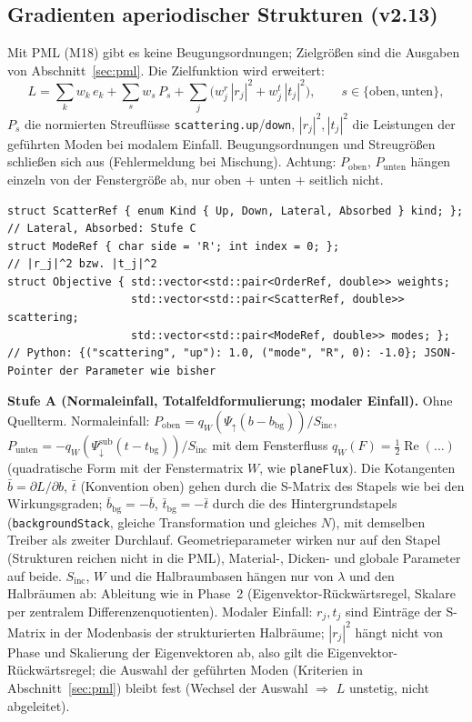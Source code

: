 \subsection{Gradienten aperiodischer Strukturen (v2.13)}\label{sec:adj_aperiodic}
Mit PML (M18) gibt es keine Beugungsordnungen; Zielgrößen sind die Ausgaben von Abschnitt~\ref{sec:pml}. Die Zielfunktion
wird erweitert:
\begin{equation}
  L=\sum_k w_k\,e_k+\sum_s w_s\,P_s+\sum_j\big(w^r_j\,|r_j|^2+w^t_j\,|t_j|^2\big),\qquad s\in\{\text{oben},\text{unten}\},
  \label{eq:obj_aperiodic}
\end{equation}
$P_s$ die normierten Streuflüsse \verb|scattering.up|/\verb|down|, $|r_j|^2,|t_j|^2$ die Leistungen der geführten Moden
bei modalem Einfall. Beugungsordnungen und Streugrößen schließen sich aus (Fehlermeldung bei Mischung).
Achtung: $P_{\text{oben}}$, $P_{\text{unten}}$ hängen einzeln von der Fenstergröße ab, nur oben $+$ unten $+$ seitlich nicht.
{\footnotesize\begin{verbatim}
struct ScatterRef { enum Kind { Up, Down, Lateral, Absorbed } kind; };          // Lateral, Absorbed: Stufe C
struct ModeRef { char side = 'R'; int index = 0; };                              // |r_j|^2 bzw. |t_j|^2
struct Objective { std::vector<std::pair<OrderRef, double>> weights;
                   std::vector<std::pair<ScatterRef, double>> scattering;
                   std::vector<std::pair<ModeRef, double>> modes; };
// Python: {("scattering", "up"): 1.0, ("mode", "R", 0): -1.0}; JSON-Pointer der Parameter wie bisher
\end{verbatim}}
\textbf{Stufe A (Normaleinfall, Totalfeldformulierung; modaler Einfall).} Ohne Quellterm. Normaleinfall:
$P_{\text{oben}}=q_W(\Psi_{\uparrow}(b-b_{\text{bg}}))/S_{\text{inc}}$, $P_{\text{unten}}=-q_W(\Psi^{\text{sub}}_{\downarrow}(t-t_{\text{bg}}))/S_{\text{inc}}$
mit dem Fensterfluss $q_W(F)=\frac12\operatorname{Re}(\dots)$ (quadratische Form mit der Fenstermatrix $W$, wie
\verb|planeFlux|). Die Kotangenten $\bar b=\partial L/\partial b$, $\bar t$ (Konvention oben) gehen durch die S-Matrix des
Stapels wie bei den Wirkungsgraden; $\bar b_{\text{bg}}=-\bar b$, $\bar t_{\text{bg}}=-\bar t$ durch die des
Hintergrundstapels (\verb|backgroundStack|, gleiche Transformation und gleiches $N$), mit demselben Treiber als zweiter
Durchlauf. Geometrieparameter wirken nur auf den Stapel (Strukturen reichen nicht in die PML), Material-, Dicken- und
globale Parameter auf beide. $S_{\text{inc}}$, $W$ und die Halbraumbasen hängen nur von $\lambda$ und den Halbräumen ab:
Ableitung wie in Phase~2 (Eigenvektor-Rückwärtsregel, Skalare per zentralem Differenzenquotienten). Modaler Einfall:
$r_j,t_j$ sind Einträge der S-Matrix in der Modenbasis der strukturierten Halbräume; $|r_j|^2$ hängt nicht von Phase und
Skalierung der Eigenvektoren ab, also gilt die Eigenvektor-Rückwärtsregel; die Auswahl der geführten Moden
(Kriterien in Abschnitt~\ref{sec:pml}) bleibt fest (Wechsel der Auswahl $\Rightarrow$ $L$ unstetig, nicht abgeleitet).

